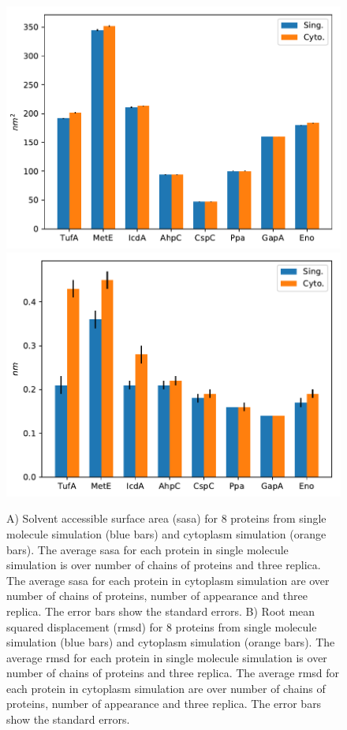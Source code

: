 \documentclass[journal=jacsat,manuscript=article]{achemso}
\begin{document}
\begin{figure}[H]
\includegraphics[scale=0.5]{sasa.pdf}
\includegraphics[scale=0.5]{rmsd.pdf}

\caption{A) Solvent accessible surface area (sasa) for 8 proteins from single molecule simulation (blue bars) and cytoplasm simulation (orange bars). The average sasa for each protein in single molecule simulation is over number of chains of proteins and three replica. The average sasa for each protein in cytoplasm simulation are over number of chains of proteins, number of appearance and three replica. The error bars show the standard errors. B) Root mean squared displacement (rmsd) for 8 proteins from single molecule simulation (blue bars) and cytoplasm simulation (orange bars). The average rmsd for each protein in single molecule simulation is over number of chains of proteins and three replica. The average rmsd for each protein in cytoplasm simulation are over number of chains of proteins, number of appearance and three replica. The error bars show the standard errors.}
\end{figure}
\end{document}
